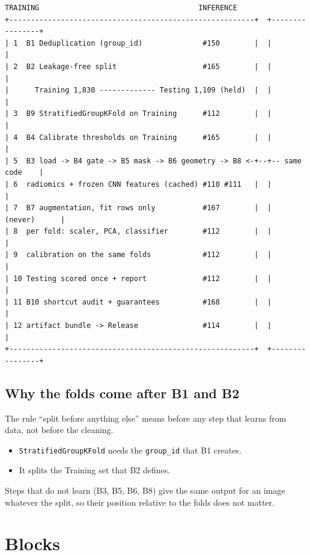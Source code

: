 \documentclass[11pt,a4paper]{article}
\begin{document}
\begin{Verbatim}[fontsize=\footnotesize, frame=single]
                     TRAINING                                     INFERENCE
+---------------------------------------------------------+  +----------------+
| 1  B1 Deduplication (group_id)              #150        |  |                |
| 2  B2 Leakage-free split                    #165        |  |                |
|      Training 1,830 ------------- Testing 1,109 (held)  |  |                |
| 3  B9 StratifiedGroupKFold on Training      #112        |  |                |
| 4  B4 Calibrate thresholds on Training      #165        |  |                |
| 5  B3 load -> B4 gate -> B5 mask -> B6 geometry -> B8 <-+--+-- same code    |
| 6  radiomics + frozen CNN features (cached) #110 #111   |  |                |
| 7  B7 augmentation, fit rows only           #167        |  |   (never)      |
| 8  per fold: scaler, PCA, classifier        #112        |  |                |
| 9  calibration on the same folds            #112        |  |                |
| 10 Testing scored once + report             #112        |  |                |
| 11 B10 shortcut audit + guarantees          #168        |  |                |
| 12 artifact bundle -> Release               #114        |  |                |
+---------------------------------------------------------+  +----------------+
\end{Verbatim}

\subsection{Why the folds come after B1 and B2}

The rule ``split before anything else'' means before any step that learns from data, not before the cleaning.

\begin{itemize}
  \item \texttt{StratifiedGroupKFold} needs the \texttt{group\_id} that B1 creates.
  \item It splits the Training set that B2 defines.
\end{itemize}

Steps that do not learn (B3, B5, B6, B8) give the same output for an image whatever the split, so their position relative to the folds does not matter.

\section{Blocks}
\end{document}
